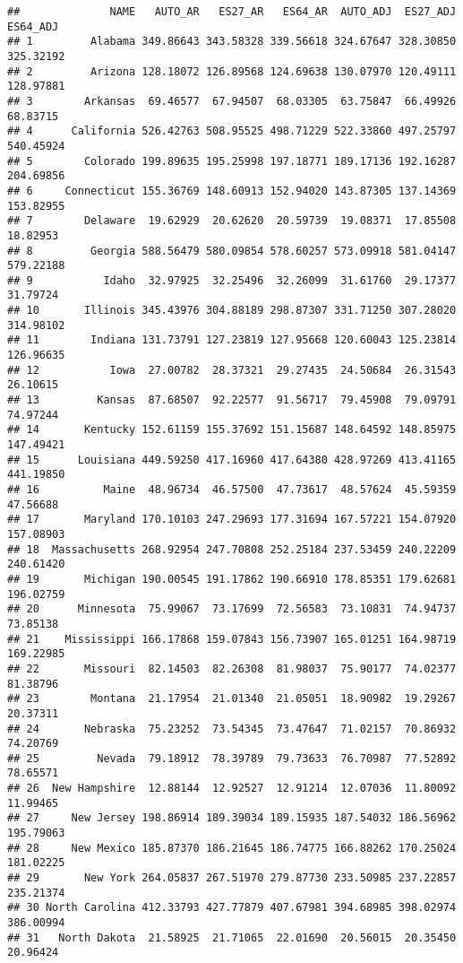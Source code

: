 \documentclass[
]{article}
\begin{document}
\begin{verbatim}
##              NAME   AUTO_AR   ES27_AR   ES64_AR  AUTO_ADJ  ES27_ADJ  ES64_ADJ
## 1         Alabama 349.86643 343.58328 339.56618 324.67647 328.30850 325.32192
## 2         Arizona 128.18072 126.89568 124.69638 130.07970 120.49111 128.97881
## 3        Arkansas  69.46577  67.94507  68.03305  63.75847  66.49926  68.83715
## 4      California 526.42763 508.95525 498.71229 522.33860 497.25797 540.45924
## 5        Colorado 199.89635 195.25998 197.18771 189.17136 192.16287 204.69856
## 6     Connecticut 155.36769 148.60913 152.94020 143.87305 137.14369 153.82955
## 7        Delaware  19.62929  20.62620  20.59739  19.08371  17.85508  18.82953
## 8         Georgia 588.56479 580.09854 578.60257 573.09918 581.04147 579.22188
## 9           Idaho  32.97925  32.25496  32.26099  31.61760  29.17377  31.79724
## 10       Illinois 345.43976 304.88189 298.87307 331.71250 307.28020 314.98102
## 11        Indiana 131.73791 127.23819 127.95668 120.60043 125.23814 126.96635
## 12           Iowa  27.00782  28.37321  29.27435  24.50684  26.31543  26.10615
## 13         Kansas  87.68507  92.22577  91.56717  79.45908  79.09791  74.97244
## 14       Kentucky 152.61159 155.37692 151.15687 148.64592 148.85975 147.49421
## 15      Louisiana 449.59250 417.16960 417.64380 428.97269 413.41165 441.19850
## 16          Maine  48.96734  46.57500  47.73617  48.57624  45.59359  47.56688
## 17       Maryland 170.10103 247.29693 177.31694 167.57221 154.07920 157.08903
## 18  Massachusetts 268.92954 247.70808 252.25184 237.53459 240.22209 240.61420
## 19       Michigan 190.00545 191.17862 190.66910 178.85351 179.62681 196.02759
## 20      Minnesota  75.99067  73.17699  72.56583  73.10831  74.94737  73.85138
## 21    Mississippi 166.17868 159.07843 156.73907 165.01251 164.98719 169.22985
## 22       Missouri  82.14503  82.26308  81.98037  75.90177  74.02377  81.38796
## 23        Montana  21.17954  21.01340  21.05051  18.90982  19.29267  20.37311
## 24       Nebraska  75.23252  73.54345  73.47647  71.02157  70.86932  74.20769
## 25         Nevada  79.18912  78.39789  79.73633  76.70987  77.52892  78.65571
## 26  New Hampshire  12.88144  12.92527  12.91214  12.07036  11.80092  11.99465
## 27     New Jersey 198.86914 189.39034 189.15935 187.54032 186.56962 195.79063
## 28     New Mexico 185.87370 186.21645 186.74775 166.88262 170.25024 181.02225
## 29       New York 264.05837 267.51970 279.87730 233.50985 237.22857 235.21374
## 30 North Carolina 412.33793 427.77879 407.67981 394.68985 398.02974 386.00994
## 31   North Dakota  21.58925  21.71065  22.01690  20.56015  20.35450  20.96424

\end{verbatim}
\end{document}
